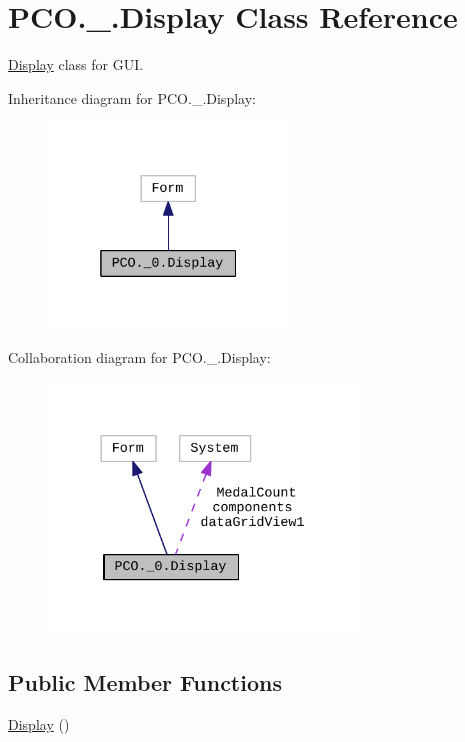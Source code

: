 \hypertarget{classPCO_1_1__0_1_1Display}{}\section{P\+C\+O.\+\_.\+Display Class Reference}
\label{classPCO_1_1__0_1_1Display}


\hyperlink{classPCO_1_1__0_1_1Display}{Display} class for G\+UI.  




Inheritance diagram for P\+C\+O.\+\_.\+Display\+:\nopagebreak
\begin{figure}[H]
\begin{center}
\leavevmode
\includegraphics[width=181pt]{classPCO_1_1__0_1_1Display__inherit__graph}
\end{center}
\end{figure}


Collaboration diagram for P\+C\+O.\+\_.\+Display\+:\nopagebreak
\begin{figure}[H]
\begin{center}
\leavevmode
\includegraphics[width=234pt]{classPCO_1_1__0_1_1Display__coll__graph}
\end{center}
\end{figure}
\subsection*{Public Member Functions}
\begin{DoxyCompactItemize}
\item 
\hyperlink{classPCO_1_1__0_1_1Display_a4f14e8f662deb892a2c07dc78da701dc}{Display} ()
\end{DoxyCompactItemize}
